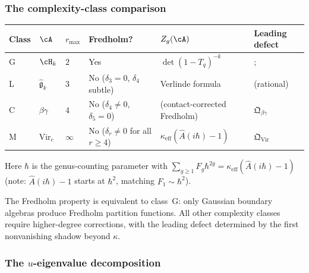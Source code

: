 \subsubsection*{The complexity-class comparison}

\begin{center}
\small
\renewcommand{\arraystretch}{1.2}
\begin{tabular}{llllll}
\textbf{Class} & $\cA$ & $r_{\max}$
 & \textbf{Fredholm?} & $Z_g(\cA)$
 & \textbf{Leading defect} \\
\hline
G & $\cH_k$ & $2$
 & Yes & $\det(1-T_q)^{-k}$ &; \\[2pt]
L & $\hat{\mathfrak{g}}_k$ & $3$
 & No ($\delta_3 = 0$, $\delta_4$ subtle)
 & Verlinde formula & (rational) \\[2pt]
C & $\beta\gamma$ & $4$
 & No ($\delta_4 \ne 0$, $\delta_5 = 0$)
 & (contact-corrected Fredholm) & $\mathfrak{Q}_{\beta\gamma}$ \\[2pt]
M & $\mathrm{Vir}_c$ & $\infty$
 & No ($\delta_r \ne 0$ for all $r \ge 4$)
 & $\kappa_{\mathrm{eff}}(\hat A(i\hbar)-1)$ & $\mathfrak{Q}_{\mathrm{Vir}}$
\end{tabular}
\end{center}

\noindent
Here $\hbar$ is the genus-counting parameter with
$\sum_{g \geq 1} F_g \hbar^{2g} = \kappa_{\mathrm{eff}}(\hat A(i\hbar)-1)$
(note: $\hat A(i\hbar)-1$ starts at $\hbar^2$, matching
$F_1 \sim \hbar^2$).

\noindent
The Fredholm property is equivalent to class~G: only Gaussian
boundary algebras produce Fredholm partition functions. All
other complexity classes require higher-degree corrections, with
the leading defect determined by the first nonvanishing shadow
beyond $\kappa$.

\subsubsection*{The $u$-eigenvalue decomposition}

